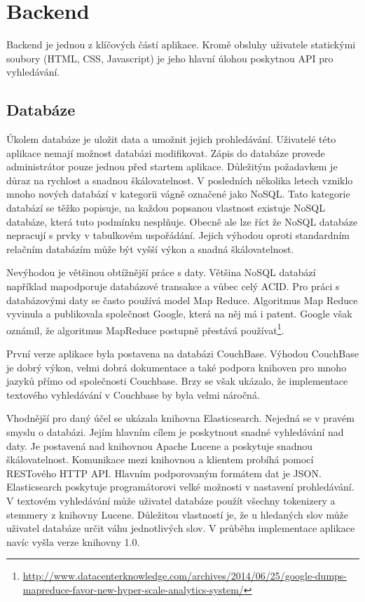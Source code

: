 \chapter{Backend}

Backend je jednou z klíčových částí aplikace. Kromě obsluhy uživatele statickými soubory (HTML, CSS, Javascript) je jeho hlavní úlohou poskytnou API pro vyhledávání.

\section{Databáze}

Úkolem databáze je uložit data a umožnit jejich prohledávání. Uživatelé této aplikace nemají možnost databázi modifikovat. Zápis do databáze provede administrátor pouze jednou před startem aplikace. Důležitým požadavkem je důraz na rychlost a snadnou škálovatelnost. V posledních několika letech vzniklo mnoho nových databází v kategorii vágně označené jako NoSQL. Tato kategorie databází se těžko popisuje, na každou popsanou vlastnost existuje NoSQL databáze, která tuto podmínku nesplňuje. Obecně ale lze říct že NoSQL databáze nepracují s prvky v tabulkovém uspořádání. Jejich výhodou oproti standardním relačním databázím může být vyšší výkon a snadná škálovatelnost.

Nevýhodou je většinou obtížnější práce s daty. Většina NoSQL databází například mapodporuje databázové transakce a vůbec celý ACID. Pro práci s databázovými daty se často používá model Map Reduce. Algoritmus Map Reduce vyvinula a publikovala společnost Google, která na něj má i patent. Google však oznámil, že algoritmus MapReduce postupně přestává používat\footnote{\url{http://www.datacenterknowledge.com/archives/2014/06/25/google-dumps-mapreduce-favor-new-hyper-scale-analytics-system/}}.

První verze aplikace byla postavena na databázi CouchBase. Výhodou CouchBase je dobrý výkon, velmi dobrá dokumentace a také podpora knihoven pro mnoho jazyků přímo od společnosti Couchbase. Brzy se však ukázalo, že implementace textového vyhledávání v Couchbase by byla velmi náročná.

Vhodnější pro daný účel se ukázala knihovna Elasticsearch. Nejedná se v pravém smyslu o databázi. Jejím hlavním cílem je poskytnout snadné vyhledávání nad daty. Je postavená nad knihovnou Apache Lucene a poskytuje snadnou škálovatelnost. Komunikace mezi knihovnou a klientem probíhá pomocí RESTového HTTP API. Hlavním podporovaným formátem dat je JSON. Elasticsearch poskytuje programátorovi velké možnosti v nastavení prohledávání. V textovém vyhledávání může uživatel databáze použít všechny tokenizery a stemmery z knihovny Lucene. Důležitou vlastností je, že u hledaných slov může uživatel databáze určit váhu jednotlivých slov. V průběhu implementace aplikace navíc vyšla verze knihovny 1.0.

